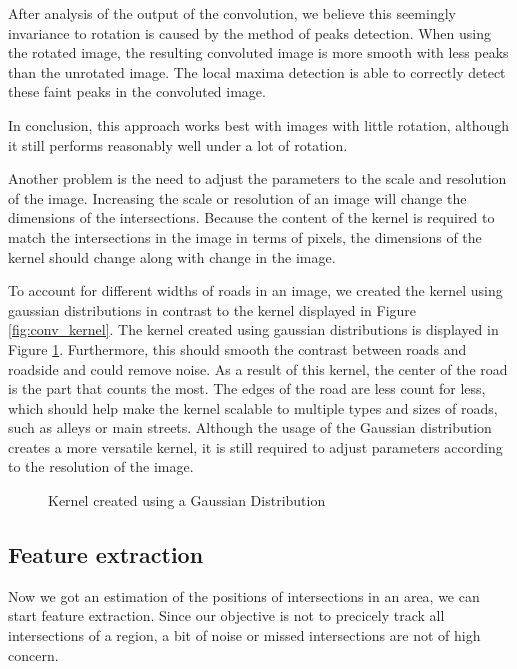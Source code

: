 After analysis of the output of the convolution, we believe this seemingly
invariance to rotation is caused by the method of peaks detection.  When using
the rotated image, the resulting convoluted image is more smooth with less
peaks than the unrotated image. The local maxima detection is able to
correctly detect these faint peaks in the convoluted image.

In conclusion, this approach works best with images with little rotation,
although it still performs reasonably well under a lot of rotation.

Another problem is the need to adjust the parameters to the scale and
resolution of the image. Increasing the scale or resolution of an image will
change the dimensions of the intersections. Because the content of the kernel
is required to match the intersections in the image in terms of pixels, the
dimensions of the kernel should change along with change in the image.

To account for different widths of roads in an image, we created the kernel
using gaussian distributions in contrast to the kernel displayed in Figure
\ref{fig:conv_kernel}. The kernel created using gaussian distributions is
displayed in Figure \ref{fig:gauss_kernel}.  Furthermore, this should smooth
the contrast between roads and roadside and could remove noise. As a result of
this kernel, the center of the road is the part that counts the most. The edges
of the road are less count for less, which should help make the kernel scalable
to multiple types and sizes of roads, such as alleys or main streets.  Although
the usage of the Gaussian distribution creates a more versatile kernel, it is
still required to adjust parameters according to the resolution of the image.

\begin{figure}
  \centering
\caption{Kernel created using a Gaussian Distribution}
\label{fig:gauss_kernel}
\end{figure}

\subsection{Feature extraction}

Now we got an estimation of the positions of intersections in an area, we can
start feature extraction. Since our objective is not to precicely track all
intersections of a region, a bit of noise or missed intersections are not of
high concern. 

